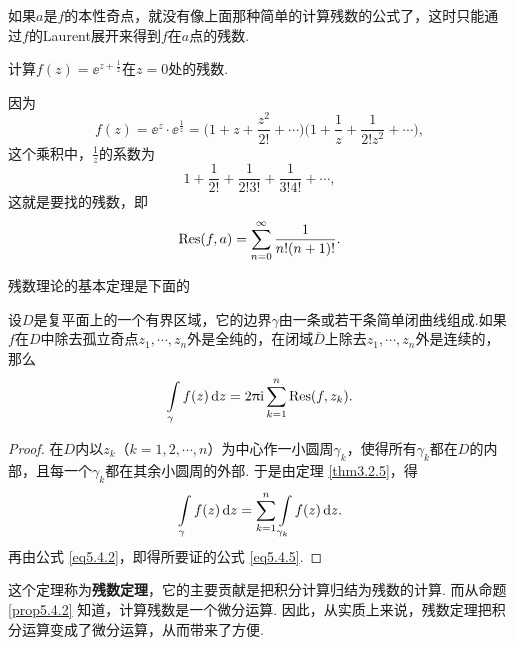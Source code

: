 如果$a$是$f$的本性奇点，就没有像上面那种简单的计算残数的公式了，这时只能通过$f$的Laurent展开来得到$f$在$a$点的残数.

\begin{example}\label{exam5.4.8}
  计算$f(z)=\ee^{z+\frac1z}$在$z=0$处的残数.
\end{example}
\begin{solution}
  因为
  \[
    f(z) = \ee^z\cdot\ee^{\frac1z} =
   \bigg(1 + z + \frac{z^2}{2!} + \cdots \bigg)\bigg(1 + \frac1z + \frac1{2!z^2} + \cdots \bigg),
  \]
  这个乘积中，$\frac1z$的系数为
  \[
    1 + \frac1{2!} + \frac1{2!3!} + \frac1{3!4!} + \cdots,
  \]
  这就是要找的残数，即
  \begin{equation*}
    \operatorname*{Res}(f,a) = \sum_{n=0}^\infty\frac1{n!(n+1)!}. \qedhere
  \end{equation*}
\end{solution}

残数理论的基本定理是下面的
\begin{theorem}\label{thm5.4.9}
  设$D$是复平面上的一个有界区域，它的边界$\gamma$由一条或若干条简单闭曲线组成.如果$f$在$D$中除去孤立奇点$z_1,\cdots,z_n$外是全纯的，在闭域$\bar D$上除去$z_1,\cdots,z_n$外是连续的，那么
  \begin{equation}\label{eq5.4.5}
    \int\limits_\gamma f(z)\mathop{}\!\mathrm dz = 2\uppi\mathrm i\sum_{k=1}^n\operatorname*{Res}(f,z_k).
  \end{equation}
\end{theorem}
\begin{proof}
  在$D$内以$z_k$（$k=1,2,\cdots,n$）为中心作一小圆周$\gamma_k$，使得所有$\gamma_k$都在$D$的内部，且每一个$\gamma_k$都在其余小圆周的外部. 于是由定理 \ref{thm3.2.5}，得
  \[
    \int\limits_\gamma f(z)\mathop{}\!\mathrm dz = \sum_{k=1}^n\int\limits_{\gamma_k}f(z)\mathop{}\!\mathrm dz.
  \]
  再由公式 \eqref{eq5.4.2}，即得所要证的公式 \eqref{eq5.4.5}.
\end{proof}

这个定理称为\textbf{残数定理}，它的主要贡献是把积分计算归结为残数的计算. 而从命题 \ref{prop5.4.2} 知道，计算残数是一个微分运算. 因此，从实质上来说，残数定理把积分运算变成了微分运算，从而带来了方便.

